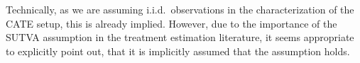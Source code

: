 Technically, as we are assuming i.i.d.\ observations in the characterization of the CATE setup, this is already implied.
However, due to the importance of the SUTVA assumption in the treatment estimation literature, it seems appropriate to explicitly point out, that it is implicitly assumed that the assumption holds.
